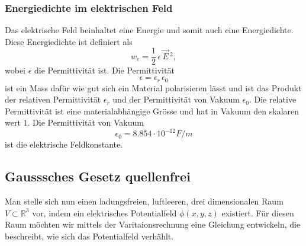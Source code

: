 \subsubsection{Energiedichte im elektrischen Feld}
Das elektrische Feld beinhaltet eine Energie und somit auch eine Energiedichte.
Diese Energiedichte ist definiert als
\begin{equation}
w_e
=
\frac{1}{2}\,\epsilon\,\vec{E}\,^2,
\label{maxwell:section:definiton_energiedichte_elektrischesFeld}
\end{equation}
wobei $\epsilon$ die Permittivität ist.
Die Permittivität
\[
\epsilon
=
\epsilon_r\,\epsilon_0
\]
ist ein Mass dafür wie gut sich ein Material polarisieren lässt und ist das Produkt der relativen Permittivität $\epsilon_r$ und der Permittivität von Vakuum $\epsilon_0$.
Die relative Permittivität ist eine materialabhängige Grösse und hat in Vakuum den skalaren wert $1$.
Die Permittivität von Vakuum
\[
\epsilon_0
=
8.854 \cdot 10^{-12} F/m
\]
ist die elektrische Feldkonstante.


\subsection{Gausssches Gesetz quellenfrei
	\label{maxwell:section:elektrostatik_ohne_quelle}}
Man stelle sich nun einen ladungsfreien, luftleeren, drei dimensionalen Raum $V\subset\mathbb{R}^3$
vor, indem ein elektrisches Potentialfeld $\phi(x,y,z)$ existiert.
Für diesen Raum möchten wir mittels der Varitaionsrechnung eine Gleichung entwickeln, die beschreibt, wie sich das Potentialfeld verhählt. 

